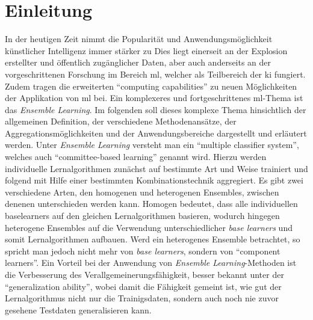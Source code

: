 


\onehalfspacing
{}
\setcounter{page}{1}
\pagestyle{scrheadings}

\section{Einleitung}

In der heutigen Zeit nimmt die Popularität und Anwendungsmöglichkeit künstlicher Intelligenz immer stärker zu \autocite[S.1]{Boutaba.2018}
Dies liegt einerseit an der Explosion erstellter und öffentlich zugänglicher Daten, aber auch anderseits an der vorgeschrittenen Forschung im Bereich \gls{ml}, welcher als Teilbereich der \gls{ki} fungiert. Zudem tragen die erweiterten \enquote{computing capabilities} \autocite[S.1]{Boutaba.2018} zu neuen Möglichkeiten der Applikation von \gls{ml} bei. Ein komplexeres und fortgeschrittenes \gls{ml}-Thema ist das \textit{Ensemble Learning}. Im folgenden soll dieses komplexe Thema hinsichtlich der allgemeinen Definition, der verschiedene Methodenansätze, der Aggregationsmöglichkeiten und der Anwendungsbereiche dargestellt und erläutert werden. Unter \textit{Ensemble Learning} versteht man ein \enquote{multiple classifier system}\autocite[S.182]{Zhou.2021}, welches auch \enquote{committee-based learning}\autocite[S.15]{Zhou.2012} genannt wird. Hierzu werden individuelle Lernalgorithmen zunächst auf bestimmte Art und Weise trainiert und folgend mit Hilfe einer bestimmten Kombinationstechnik aggregiert. Es gibt zwei verschiedene Arten, den homogenen und heterogenen Ensembles, zwischen denenen unterschieden werden kann. Homogen bedeutet, dass alle individuellen \glspl{baselearner}\autocite[S.182]{Zhou.2021} auf den gleichen Lernalgorithmen basieren, wodurch hingegen heterogene Ensembles auf die Verwendung unterschiedlicher \textit{base learners} und somit Lernalgorithmen aufbauen. Werd ein heterogenes Ensemble betrachtet, so spricht man jedoch nicht mehr von \textit{base learners}, sondern von \enquote{component learners}\autocite[S.15]{Zhou.2012}. Ein Vorteil bei der Anwendung von \textit{Ensemble Learning}-Methoden ist die Verbesserung des Verallgemeinerungsfähigkeit, besser bekannt unter der \enquote{generalization ability}\autocite[S.15]{Zhou.2021}, wobei damit die Fähigkeit gemeint ist, wie gut der Lernalgorithmus nicht nur die Trainigsdaten, sondern auch noch nie zuvor gesehene Testdaten generalisieren kann.

